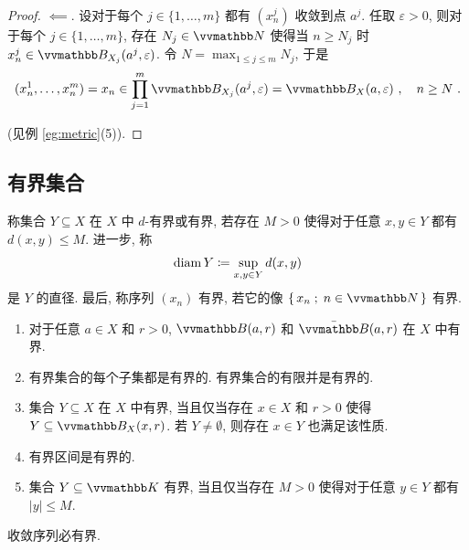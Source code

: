 \begin{example}
\begin{enumerate}
\begin{proof}
            \(\impliedby\). 设对于每个 \(j \in \{1, \ldots, m\}\) 都有 \((x_n^j)\) 收敛到点 \(a^j\). 任取 \(\varepsilon > 0\), 则对于每个 \(j \in \{1, \ldots, m\}\), 存在 \(N_j \in \N\) 使得当 \(n \geq N_j\) 时 \(x_n^j \in \B_{X_j}(a^j, \varepsilon)\). 令 \(N = \max_{1 \leq j \leq m} N_j\), 于是
            \[
                (x_n^1, \ldots, x_n^m) = x_n \in \prod_{j = 1}^m \B_{X_j}(a^j, \varepsilon) = \B_X(a, \varepsilon)\ ,\quad n \geq N\ .
            \]

            (见例 \ref{eg:metric}(5)).
        \end{proof}
    \end{enumerate}
\end{example}

\subsection{有界集合}

\begin{definition}[有界集合]
    称集合 \(Y \subseteq X\) 在 \(X\) 中 \(d\)-有界或有界, 若存在 \(M > 0\) 使得对于任意 \(x, y \in Y\) 都有 \(d(x, y) \leq M\). 进一步, 称
    \[
        \operatorname{diam} Y \coloneqq \sup_{x, y \in Y} d(x, y)
    \]
    是 \(Y\) 的直径. 最后, 称序列 \((x_n)\) 有界, 若它的像 \(\{\, x_n \;;\; n \in \N \,\}\) 有界.
\end{definition}

\begin{example}\label{eg:bounded-sets}
    \begin{enumerate}
        \item 对于任意 \(a \in X\) 和 \(r > 0\), \(\B(a, r)\) 和 \(\bar \B(a, r)\) 在 \(X\) 中有界.
        \item 有界集合的每个子集都是有界的. 有界集合的有限并是有界的.
        \item 集合 \(Y \subseteq X\) 在 \(X\) 中有界, 当且仅当存在 \(x \in X\) 和 \(r > 0\) 使得 \(Y \subseteq \B_X(x, r)\). 若 \(Y \neq \emptyset\), 则存在 \(x \in Y\) 也满足该性质.
        \item 有界区间是有界的.
        \item 集合 \(Y \subseteq \K\) 有界, 当且仅当存在 \(M > 0\) 使得对于任意 \(y \in Y\) 都有 \(|y| \leq M\).
    \end{enumerate}
\end{example}

\begin{proposition}[有界性]\label{prop:convergent-sequence-is-bounded}
    收敛序列必有界.
\end{proposition}

